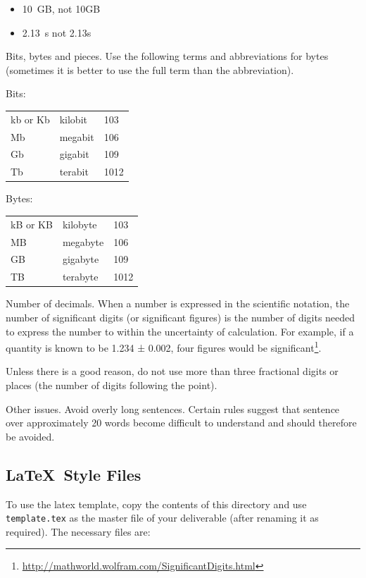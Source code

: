 \begin{itemize}
    \item 10~GB, not 10GB
    \item 2.13~s not 2.13s
\end{itemize}

Bits, bytes and pieces. Use the following terms and abbreviations for bytes (sometimes it is better to use the full term than the abbreviation).

Bits:\\
\begin{tabular}{lll}
    kb or Kb&	kilobit&	103\\
    Mb&	megabit&	106\\
    Gb&	gigabit&	109\\
    Tb&	terabit&	1012\\
\end{tabular}

Bytes:\\
\begin{tabular}{lll}
    kB or KB&	kilobyte&	103\\
    MB&	megabyte&106\\
    GB	&gigabyte	&109\\
    TB	&terabyte	&1012\\
\end{tabular}

Number of decimals. When a number is expressed in the scientific notation, the number of significant digits (or significant figures) is the number of digits needed to express the number to within the uncertainty of calculation. For example, if a quantity is known to be 1.234 ± 0.002, four figures would be significant\footnote{\url{http://mathworld.wolfram.com/SignificantDigits.html}}.

Unless there is a good reason, do not use more than three fractional digits or places (the number of digits following the point).

Other issues. Avoid overly long sentences. Certain rules suggest that sentence over approximately 20 words become difficult to understand and should therefore be avoided.

\subsection{\LaTeX\ Style Files}
\label{sec:latex-style-files}

\newcommand{\macro}[1]{{\tt \textbackslash #1}}

To use the latex template, copy the contents of this directory and use {\tt template.tex} as the master file of your deliverable (after renaming it as required). The necessary files are:

